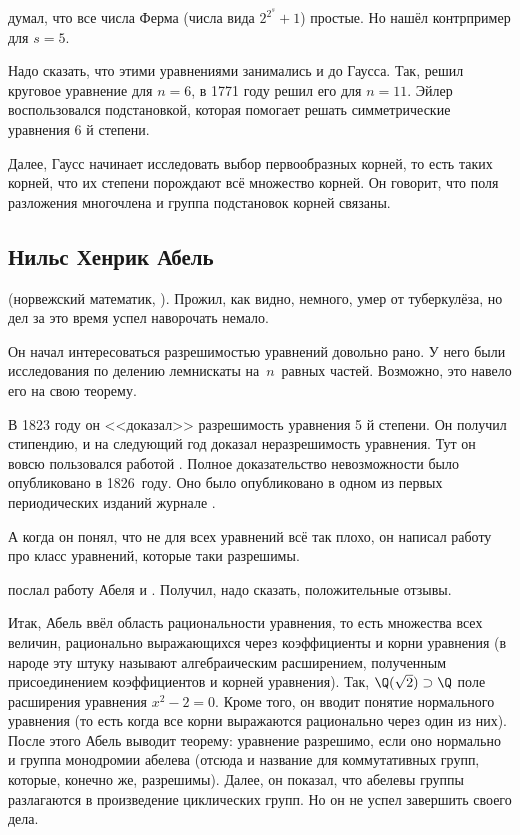 \documentclass[a4paper,oneside,fleqn,10pt]{article}
\begin{document}
 думал, что все числа Ферма (числа вида $2^{2^s} + 1$)
простые. Но  нашёл контрпример для $s=5$.

Надо сказать, что этими уравнениями занимались и до Гаусса.  Так,
 решил круговое уравнение для $n=6$, в 1771 году
 решил его для $n=11$.  Эйлер воспользовался
подстановкой, которая помогает решать симметрические уравнения 6 й
степени.

Далее, Гаусс начинает исследовать выбор первообразных корней, то есть
таких корней, что их степени порождают всё множество корней.  Он
говорит, что поля разложения многочлена и группа подстановок корней
связаны.

\subsection{Нильс Хенрик Абель}

 (норвежский математик,
).  Прожил, как видно, немного, умер от туберкулёза, но
дел за это время успел наворочать немало.

Он начал интересоваться разрешимостью уравнений довольно рано.  У него
были исследования по делению лемнискаты на~$n$~равных частей.
Возможно, это навело его на свою теорему.

В 1823 году он <<доказал>> разрешимость уравнения 5 й степени. Он
получил стипендию, и на следующий год доказал неразрешимость
уравнения. Тут он вовсю пользовался работой . Полное
доказательство невозможности было опубликовано в 1826~году.  Оно было
опубликовано в одном из первых периодических изданий журнале
.

А когда он понял, что не для всех уравнений всё так плохо, он написал
работу про класс уравнений, которые таки разрешимы.

 послал работу Абеля  и
.  Получил, надо сказать, положительные отзывы.

Итак, Абель ввёл область рациональности уравнения, то есть множества
всех величин, рационально выражающихся через коэффициенты и корни
уравнения (в народе эту штуку называют алгебраическим расширением,
полученным присоединением коэффициентов и корней уравнения).  Так,
$\Q(\sqrt2) \supset \Q$ поле расширения уравнения $x^2 -2=0$.  Кроме
того, он вводит понятие нормального уравнения (то есть когда все корни
выражаются рационально через один из них). После этого Абель выводит
теорему: уравнение разрешимо, если оно нормально и группа монодромии
абелева (отсюда и название для коммутативных групп, которые, конечно
же, разрешимы).  Далее, он показал, что абелевы группы разлагаются в
произведение циклических групп.  Но он не успел завершить своего дела.
\end{document}
